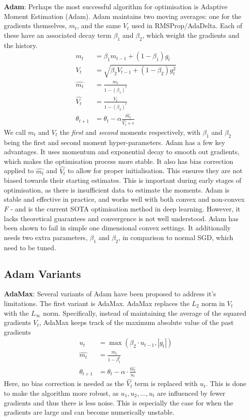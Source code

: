 \textbf{Adam}: Perhaps the most successful algorithm for optimisation is Adaptive Moment Estimation (Adam). Adam maintains two moving averages: one for the gradients themselves, $m_t$, and the same $V_t$ used in RMSProp/AdaDelta. Each of these have an associated decay term $\beta_1$ and $\beta_2$, which weight the gradients and the history.
\begin{align}
m_t &= \beta_1 m_{t-1} + (1 - \beta_1) g_t \label{eq:m_t} \\
V_t &= \sqrt{\beta_2 V_{t-1} + (1 - \beta_2) g_t^2} \\
\hat{m_t} &= \frac{m_t}{1 - (\beta_1)^t} \\
\hat{V_t} &= \frac{V_t}{1 - (\beta_2)^t} \\
\theta_{t+1} &= \theta_t - \alpha \frac{\hat{m_t}}{{\hat{V_t}} + \epsilon} \label{eq:adam_update}
\end{align}
We call $m_t$ and $V_t$ the \textit{first} and \textit{second} moments respectively, with $\beta_1$ and $\beta_2$ being the first and second moment hyper-parameters. Adam has a few key advantages. It uses momentum and exponential decay to smooth out gradients, which makes the optimisation process more stable. It also has bias correction applied to $\hat{m_t}$ and $\hat{V_t}$ to allow for proper initialisation. This ensures they are not biased towards their starting estimates. This is important during early stages of optimisation, as there is insufficient data to estimate the moments. Adam is stable and effective in practice, and works well with both convex and non-convex $F$ - and is the current SOTA optimisation method in deep learning. However, it lacks theoretical guarantees and convergence is not well understood. Adam has been shown to fail in simple one dimensional convex settings. It additionally needs two extra parameters, $\beta_1$ and $\beta_2$, in comparison to normal SGD, which need to be tuned.

\subsection{Adam Variants}
\textbf{AdaMax}: Several variants of Adam have been proposed to address it's limitations. The first variant is AdaMax. AdaMax replaces the $L_2$ norm in $V_t$ with the $L_{\infty}$ norm. Specifically, instead of maintaining the average of the squared gradients $V_t$, AdaMax keeps track of the maximum absolute value of the past gradients
\begin{align}
    u_t &= \max(\beta_2 \cdot u_{t-1}, |g_t|) \\ 
    \hat{m_t} &= \frac{m_t}{1 - \beta_1^t} \\
    \theta_{t+1} &= \theta_t - \alpha \cdot \frac{\hat{m_t}}{u_t}
\end{align}
Here, no bias correction is needed as the $\hat{V_t}$ term is replaced with $u_t$. This is done to make the algorithm more robust, as $u_1, u_2, \dots, u_t$ are influenced by fewer gradients and thus there is less noise. This is especially the case for when the gradients are large and can become numerically unstable.

